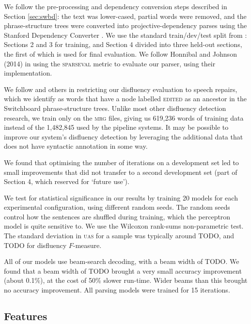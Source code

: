 \documentclass[11pt,letterpaper]{article}
\newcommand{\sparseval}{\textsc{sparseval}\xspace}
\begin{document}
We follow the pre-processing and dependency conversion steps described in
Section \ref{sec:swbd}: the text was lower-cased, partial words were removed,
and the phrase-structure trees were converted into projective-dependency parses
using the Stanford Dependency Converter \citep{stanford_deps}.
We use the standard train/dev/test split from \citet{Charniak01a}: Sections 2
and 3 for training, and Section 4 divided into three held-out sections, the first
of which is used for final evaluation.
We follow Honnibal and Johnson (2014) in using the \sparseval \citep{sparseval}
metric to evaluate our parser, using their implementation.

We follow \citet{Johnson04a} and others in restricting our disfluency evaluation
to speech repairs, which we identify as words that have a node labelled \textsc{edited}
as an ancestor in the Switchboard phrase-structure trees.  Unlike most other
disfluency detection research, we train only
on the \textsc{mrg} files, giving us 619,236 words of training data instead of
the 1,482,845 used by the pipeline systems.  It may be possible to improve our
system's disfluency detection by leveraging the additional data that does not
have syntactic annotation in some way.

We found that optimising the number of iterations on a development set led to
small improvements that did not transfer to a second development set (part of
Section 4, which \citet{Charniak01a} reserved for `future use').

We test for statistical significance in our results by training 20 models for
each experimental configuration, using different random seeds. The random seeds
control how the sentences are shuffled during training, which the perceptron
model is quite sensitive to.  We use the Wilcoxon rank-sums non-parametric test.
The standard deviation in \textsc{uas} for a sample was typically around TODO,
and TODO for disfluency $F$-measure.

All of our models use beam-search decoding, with a beam width of TODO. We found that
a beam width of TODO brought a very small accuracy improvement (about 0.1\%), at
the cost of 50\% slower run-time. Wider beams than this brought no accuracy improvement.
All parsing models were trained for 15 iterations.

\subsection{Features}
\end{document}
